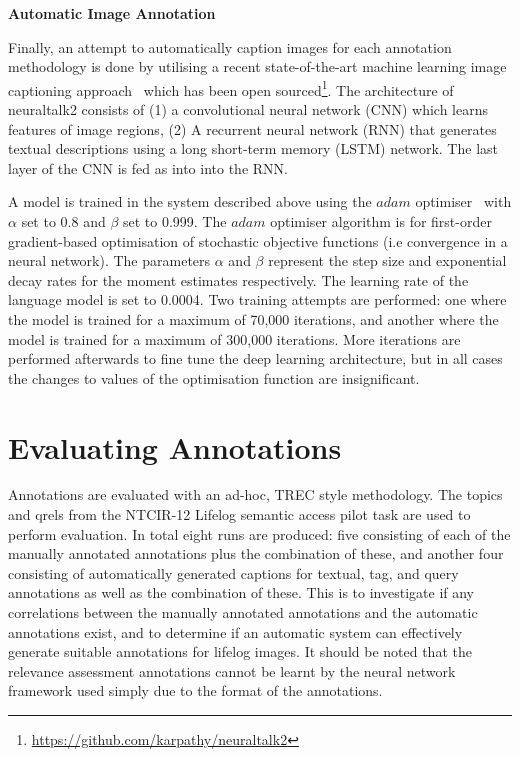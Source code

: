 \newpage
\textbf{Automatic Image Annotation}

Finally, an attempt to automatically caption images for each annotation methodology is done by utilising a recent state-of-the-art machine learning image captioning approach~\cite{karpathy2015deep} which has been open sourced\footnote{\url{https://github.com/karpathy/neuraltalk2}}. The architecture of neuraltalk2 consists of (1) a convolutional neural network (CNN) which learns features of image regions, (2) A recurrent neural network (RNN) that generates textual descriptions using a long short-term memory (LSTM) network. The last layer of the CNN is fed as into into the RNN.

A model is trained in the system described above using the $adam$ optimiser~\cite{kingma2014adam} with $\alpha$ set to 0.8 and $\beta$ set to 0.999. The $adam$ optimiser algorithm is for first-order gradient-based optimisation of stochastic objective functions (i.e convergence in a neural network). The parameters $\alpha$ and $\beta$ represent the step size and exponential decay rates for the moment estimates respectively. The learning rate of the language model is set to 0.0004. Two training attempts are performed: one where the model is trained for a maximum of 70,000 iterations, and another where the model is trained for a maximum of 300,000 iterations. More iterations are performed afterwards to fine tune the deep learning architecture, but in all cases the changes to values of the optimisation function are insignificant.

\section{Evaluating Annotations}\label{methods:evaluating}

Annotations are evaluated with an ad-hoc, TREC style methodology. The topics and qrels from the NTCIR-12 Lifelog semantic access pilot task are used to perform evaluation. In total eight runs are produced: five consisting of each of the manually annotated annotations plus the combination of these, and another four consisting of automatically generated captions for textual, tag, and query annotations as well as the combination of these. This is to investigate if any correlations between the manually annotated annotations and the automatic annotations exist, and to determine if an automatic system can effectively generate suitable annotations for lifelog images. It should be noted that the relevance assessment annotations cannot be learnt by the neural network framework used simply due to the format of the annotations.


